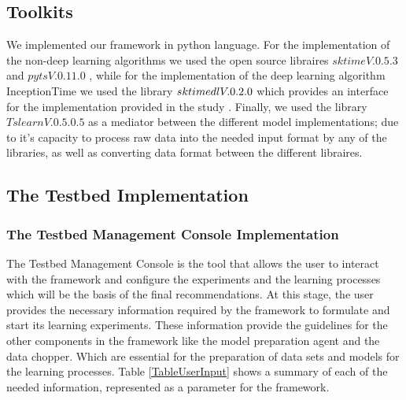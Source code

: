 \subsection{Toolkits}
\label{SubsectionToolkits}
We implemented our framework in python language.
For the implementation of the non-deep learning algorithms we used the open source libraires $sktime V. 0.5.3$ \cite{loning2019sktime} and $pyts V. 0.11.0$ \cite{JMLR:v21:19-763},
while for the implementation of the deep learning algorithm InceptionTime we used the library $sktime\-dl V .0.2.0$ which provides an interface for the implementation provided
in the study \cite{fawaz2020inceptiontime}. Finally, we used the library $Tslearn V. 0.5.0.5$ \cite{JMLR:v21:20-091} as a mediator between the different model implementations; due to it's
capacity to process raw data into the needed input format by any of the libraries, as well as converting data format between the different libraires.

\subsection{The Testbed Implementation}
\label{SubsectionTestbedImplementation}

\subsubsection{The Testbed Management Console Implementation}
\label{SubsectionTestbedManagementConsoleImplementation}
The Testbed Management Console is the tool that allows the user to interact with the framework and configure the experiments
and the learning processes which will be the basis of the final recommendations.
At this stage, the user provides the necessary information required by the framework to formulate and start its learning experiments.
These information provide the guidelines for the other components in the framework like the model preparation agent and the data chopper.
Which are essential for the preparation of data sets and models for the learning processes.
Table \ref{TableUserInput} shows a summary of each of the needed information, represented as a parameter for the framework.

